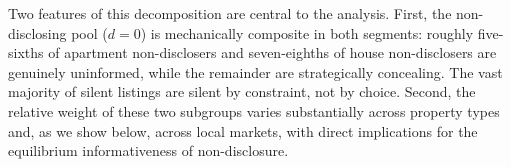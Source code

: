 \noindent Two features of this decomposition are central to the analysis. First, the non-disclosing pool ($d=0$) is mechanically composite in both segments: roughly five-sixths of apartment non-disclosers and seven-eighths of house non-disclosers are genuinely uninformed, while the remainder are strategically concealing. The vast majority of silent listings are silent by constraint, not by choice. Second, the relative weight of these two subgroups varies substantially across property types and, as we show below, across local markets, with direct implications for the equilibrium informativeness of non-disclosure.
